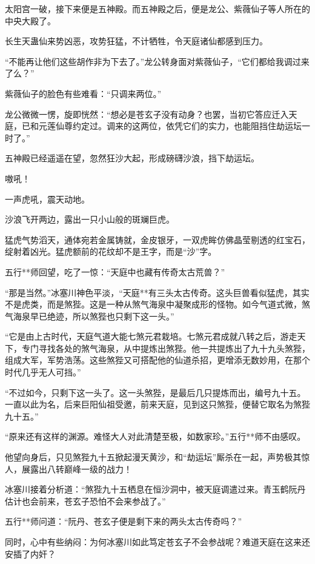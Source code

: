 
\begin{this_body}

太阳宫一破，接下来便是五神殿。而五神殿之后，便是龙公、紫薇仙子等人所在的中央大殿了。

长生天蛊仙来势凶恶，攻势狂猛，不计牺牲，令天庭诸仙都感到压力。

“不能再让他们这些胡作非为下去了。”龙公转身面对紫薇仙子，“它们都给我调过来了么？”

紫薇仙子的脸色有些难看：“只调来两位。”

龙公微微一愣，旋即恍然：“想必是苍玄子没有动身？也罢，当初它答应迁入天庭，已和元莲仙尊约定过。调来的这两位，依凭它们的实力，也能阻挡住劫运坛一时了。”

五神殿已经遥遥在望，忽然狂沙大起，形成磅礴沙浪，挡下劫运坛。

嗷吼！

一声虎吼，震天动地。

沙浪飞开两边，露出一只小山般的斑斓巨虎。

猛虎气势滔天，通体宛若金属铸就，金皮银牙，一双虎眸仿佛晶莹剔透的红宝石，绽射着凶光。猛虎额前的花纹却不是王字，而是“沙”字。

五行**师回望，吃了一惊：“天庭中也藏有传奇太古荒兽？”

“那是当然。”冰塞川神色平淡，“天庭**有三头太古传奇。这头巨兽看似猛虎，其实不是虎类，而是煞狴。这是一种从煞气海泉中凝聚成形的怪物。如今气道式微，煞气海泉早已绝迹，所以煞狴也只剩下这一头。”

“它是由上古时代，天庭气道大能七煞元君栽培。七煞元君成就八转之后，游走天下，专门寻找各处的煞气海泉，从中提炼出煞狴。他一共提炼出了九十九头煞狴，组成大军，军势浩荡。这些煞狴又可搭配他的仙道杀招，更增添无数妙用，在那个时代几乎无人可挡。”

“不过如今，只剩下这一头了。这一头煞狴，是最后几只提炼而出，编号九十五。一直以此为名，后来巨阳仙祖受邀，前来天庭，见到这只煞狴，便替它取名为煞狴九十五。”

“原来还有这样的渊源。难怪大人对此清楚至极，如数家珍。”五行**师不由感叹。

他望向身后，只见煞狴九十五掀起漫天黄沙，和“劫运坛”厮杀在一起，声势极其惊人，展露出八转巅峰一级的战力！

冰塞川接着分析道：“煞狴九十五栖息在恒沙洞中，被天庭调遣过来。青玉鹤阮丹估计也会前来，苍玄子恐怕不会来参战了。”

五行**师问道：“阮丹、苍玄子便是剩下来的两头太古传奇吗？”

同时，心中有些纳闷：为何冰塞川如此笃定苍玄子不会参战呢？难道天庭在这来还安插了内奸？


\end{this_body}
